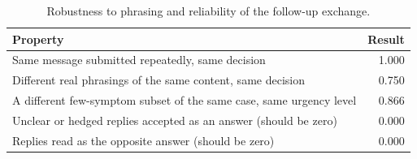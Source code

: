 \documentclass[11pt]{article}
\begin{document}
\begin{table}[h]
\centering
\caption{Robustness to phrasing and reliability of the follow-up exchange.}
\label{tab:robustness}
\small
\begin{tabular}{p{11cm}r}
\toprule
Property & Result \\
\midrule
Same message submitted repeatedly, same decision & 1.000 \\
Different real phrasings of the same content, same decision & 0.750 \\
A different few-symptom subset of the same case, same urgency level & 0.866 \\
Unclear or hedged replies accepted as an answer (should be zero) & 0.000 \\
Replies read as the opposite answer (should be zero) & 0.000 \\
\bottomrule
\end{tabular}
\end{table}
\end{document}
